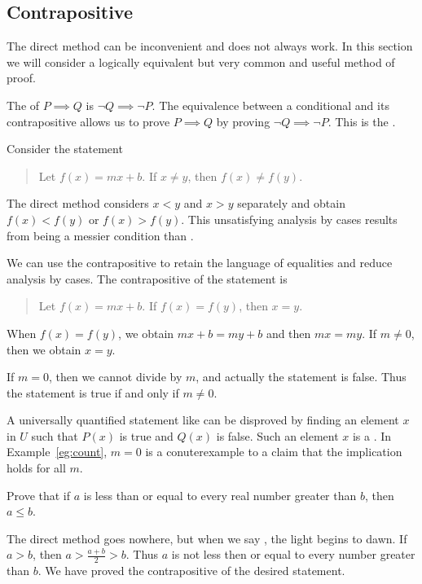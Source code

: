 \subsection{Contrapositive}

The direct method can be inconvenient and does not always work.
In this section we will consider a logically equivalent
but very common and useful method of proof.

The  of $P\implies Q$ is $\neg Q\implies \neg P$.
The equivalence between a conditional and its contrapositive allows us
to prove $P\implies Q$ by proving $\neg Q\implies \neg P$.
This is the .


\begin{eg}\label{eg:count}
Consider the statement
\begin{quotation}
Let $f(x)=mx+b$. If $x\neq y$, then $f(x)\neq f(y)$.\hfill\mybf{*}
\end{quotation}
The direct method considers $x<y$ and $x>y$ separately and obtain $f(x)<f(y)$ or $f(x)>f(y)$.
This unsatisfying analysis by cases results from  being a messier condition than .

We can use the contrapositive to retain the language of equalities and reduce analysis by cases.
The contrapositive of the statement \mybf{*} is
\begin{quotation}
Let $f(x)=mx+b$. If $f(x) = f(y)$, then $x = y$. 
\end{quotation}
When $f(x)=f(y)$, we obtain $mx+b = my +b$ and then $mx=my$.
If $m\neq 0$, then we obtain $x=y$.

If $m=0$, then we cannot divide by $m$, and actually the statement is false.
Thus the statement is true if and only if $m\neq 0$.
\end{eg}


A universally quantified statement like 
can be disproved by finding an element $x$ in $U$ such that $P(x)$ is true and $Q(x)$ is false.
Such an element $x$ is a .
In Example~\ref{eg:count}, $m=0$ is a conuterexample to a claim that the implication holds for all $m$.


\begin{eg}
Prove that if $a$ is less than or equal to every real number greater than $b$, then $a\leq b$.
\end{eg}
\begin{sol}
The direct method goes nowhere,
but when we say , the light begins to dawn.
If $a>b$, then $a>\frac{a+b}{2}>b$.
Thus $a$ is not less then or equal to every number greater than $b$.
We have proved the contrapositive of the desired statement.
\end{sol}



